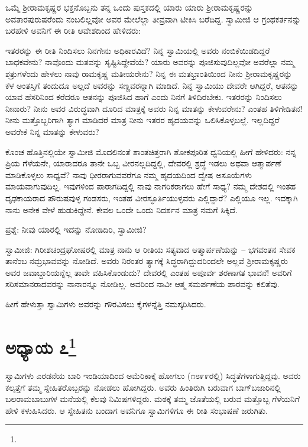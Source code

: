 ಒಮ್ಮೆ ಶ‍್ರೀರಾಮಕೃಷ್ಣರ ಭಕ್ತನೊಬ್ಬನು ತನ್ನ ಒಂದು ಪುಸ್ತಕದಲ್ಲಿ ಯಾರು ಯಾರು ಶ‍್ರೀರಾಮಕೃಷ್ಣರನ್ನು ಅವತಾರಪುರುಷರೆಂದು ನಂಬಲಿಲ್ಲವೋ ಅವರ ಮೇಲೆಲ್ಲಾ ತೀವ್ರವಾಗಿ ಟೀಕಿಸಿ ಬರೆದಿದ್ದ. ಸ್ವಾಮೀಜಿ ಆ ಗ್ರಂಥಕರ್ತನನ್ನು ಬರಹೇಳಿ ಅವನಿಗೆ ಈ ರೀತಿ ಆವೇಶದಿಂದ ಹೇಳಿದರು:

ಇತರರನ್ನು ಈ ರೀತಿ ನಿಂದಿಸಲು ನಿನಗೇನು ಅಧಿಕಾರವಿದೆ? ನಿನ್ನ ಸ್ವಾಮಿಯಲ್ಲಿ ಅವರು ನಂಬಿಕೆಯಿಡದಿದ್ದರೆ ಬಾಧಕವೇನು? ನಾವೊಂದು ಮತವನ್ನು ಸೃಷ್ಟಿಸಿದ್ದೇವೆಯೆ? ಯಾರು ಅವರನ್ನು ಪೂಜಿಸುವುದಿಲ್ಲವೋ ಅವರೆಲ್ಲಾ ನಮ್ಮ ಶತ್ರುಗಳೆಂದು ಹೇಳಲು ನಾವು ರಾಮಕೃಷ್ಣ ಮತೀಯರೇನು? ನಿನ್ನ ಈ ಮತಭ್ರಾಂತಿಯಿಂದ ನೀನು ಶ‍್ರೀರಾಮಕೃಷ್ಣರನ್ನು ಕೆಳ ಅಂತಸ್ತಿಗೆ ತಂದುದೂ ಅಲ್ಲದೆ ಅವರನ್ನು ಸಣ್ಣವರನ್ನಾಗಿ ಮಾಡಿದೆ. ನಿನ್ನ ಸ್ವಾಮಿಯು ದೇವರೇ ಆಗಿದ್ದರೆ, ಆತನನ್ನು ಯಾವ ಹೆಸರಿನಿಂದ ಕರೆದರೂ ಆತನನ್ನು ಪೂಜಿಸಿದ ಹಾಗೆ ಎಂದು ನಿನಗೆ ತಿಳಿದಿರಬೇಕು. ಇತರರನ್ನು ನಿಂದಿಸಲು ನೀನಾರು? ನೀನು ಅವರ ವಿರುದ್ಧವಾಗಿ ದೂರಿದ ಮಾತ್ರಕ್ಕೆ ಅವರು ನಿನ್ನ ಮಾತನ್ನು ಕೇಳುವರೇನು? ಎಂತಹ ತಿಳಿಗೇಡಿತನ! ನೀನು ಮತ್ತೊಬ್ಬರಿಗಾಗಿ ತ್ಯಾಗ ಮಾಡಿದರೆ ಮಾತ್ರ ನೀನು ಇತರರ ಹೃದಯವನ್ನು ಒಲಿಸಿಕೊಳ್ಳಬಲ್ಲೆ. ಇಲ್ಲದಿದ್ದರೆ ಅವರೇಕೆ ನಿನ್ನ ಮಾತನ್ನು ಕೇಳುವರು?

ಕೊಂಚ ಹೊತ್ತಿನಲ್ಲಿಯೇ ಸ್ವಾಮೀಜಿ ಮೊದಲಿನಂತೆ ಶಾಂತಚಿತ್ತರಾಗಿ ಶೋಕಪೂರಿತ ಧ್ವನಿಯಲ್ಲಿ ಹೀಗೆ ಹೇಳಿದರು: ನನ್ನ ಪ್ರಿಯ ಗೆಳೆಯನೇ, ಯಾರಾದರೂ ತಾನೇ ಒಬ್ಬ ವೀರನಲ್ಲದಿದ್ದಲ್ಲಿ, ದೇವರಲ್ಲಿ ಶ್ರದ್ಧೆ ಇಡಲು ಅಥವಾ ಆತ್ಮಾರ್ಪಣೆ ಮಾಡಿಕೊಳ್ಳಲು ಸಾಧ್ಯವೆ? ನಾವು ಧೀರರಾಗುವವರೆಗೂ ನಮ್ಮ ಹೃದಯದಿಂದ ದ್ವೇಷ ಅಸೂಯೆಗಳು ಮಾಯವಾಗುವುದಿಲ್ಲ. ಇವುಗಳಿಂದ ಪಾರಾಗದಿದ್ದಲ್ಲಿ ನಾವು ನಾಗರಿಕರಾಗಲು ಹೇಗೆ ಸಾಧ್ಯ? ನಮ್ಮ ದೇಶದಲ್ಲಿ ಇಂತಹ ದೃಢಕಾಯರಾದ ಪೌರುಷವುಳ್ಳ ಗಂಡಸರು, ಇಂತಹ ವೀರಸ್ಫೂರ್ತಿಯುಳ್ಳವರು ಎಲ್ಲಿದ್ದಾರೆ? ಎಲ್ಲಿಯೂ ಇಲ್ಲ. ಇದಕ್ಕಾಗಿ ನಾನು ಅನೇಕ ವೇಳೆ ಹುಡುಕಿದ್ದೇನೆ. ಕೇವಲ ಒಂದೇ ಒಂದು ನಿದರ್ಶನ ಮಾತ್ರ ನಮಗೆ ಸಿಕ್ಕಿದೆ.

ಪ್ರಶ್ನೆ: ನೀವು ಯಾರಲ್ಲಿ ಇದನ್ನು ನೋಡಿದಿರಿ, ಸ್ವಾಮೀಜಿ?

ಸ್ವಾಮೀಜಿ: ಗಿರೀಶಚಂದ್ರಘೋಷರಲ್ಲಿ ಮಾತ್ರ ನಾನು ಆ ರೀತಿಯ ಸತ್ಯವಾದ ಆತ್ಮಾರ್ಪಣೆಯನ್ನು – ಭಗವಂತನ ಸೇವಕ ತಾನೆಂಬ ನಮ್ರಭಾವವನ್ನು ನೋಡಿದೆ. ಅವರು ನಿರಂತರ ತ್ಯಾಗಕ್ಕೆ ಸಿದ್ಧರಾಗಿದ್ದುದರಿಂದಲೇ ಅಲ್ಲವೆ ಶ‍್ರೀರಾಮಕೃಷ್ಣರು ಅವರ ಜವಾಬ್ದಾರಿಯನ್ನೆಲ್ಲ ತಾವೇ ವಹಿಸಿಕೊಂಡುದು? ದೇವರಲ್ಲಿ ಎಂತಹ ಅಪೂರ್ವ ಶರಣಾಗತ ಭಾವನೆ! ಅವರಿಗೆ ಸರಿಸಮಾನರಾದವರನ್ನು ನಾನಾರನ್ನೂ ನೋಡಿಲ್ಲ. ಅವರಿಂದ ನಾವೀ ಆತ್ಮ ಸಮರ್ಪಣೆಯ ಪಾಠವನ್ನು ಕಲಿತೆವು.

ಹೀಗೆ ಹೇಳುತ್ತಾ ಸ್ವಾಮಿಗಳು ಅವರನ್ನು ಗೌರವಿಸಲು ಕೈಗಳನ್ನೆತ್ತಿ ನಮಸ್ಕರಿಸಿದರು.

\newpage

\chapter[ಅಧ್ಯಾಯ ೭]{ಅಧ್ಯಾಯ ೭\protect\footnote{}}

ಸ್ವಾಮಿಗಳು ಎರಡನೆಯ ಬಾರಿ ಇಂಡಿಯಾದಿಂದ ಅಮೆರಿಕಾಕ್ಕೆ ಹೋಗಲು (೧೮೯೯ರಲ್ಲಿ) ಸಿದ್ಧತೆಗಳಾಗುತ್ತಿದ್ದವು. ಅವರು ಕಲ್ಕತ್ತೆಗೆ ತಮ್ಮ ಸ್ನೇಹಿತರೊಬ್ಬರನ್ನು ನೋಡಲು ಹೋಗಿದ್ದರು. ಅವರು ಹಿಂತಿರುಗಿ ಬರುವಾಗ ಬಾಗ್‌ಬಜಾರಿನಲ್ಲಿ ಬಲರಾಮಬಾಬುಗಳ ಮನೆಯಲ್ಲಿ ಕೆಲವು ನಿಮಿಷಗಳಿದ್ದರು. ಮಠಕ್ಕೆ ತಮ್ಮ ಜೊತೆಯಲ್ಲಿ ಬರುವ ಮತ್ತೊಬ್ಬ ಗೆಳೆಯನಿಗೆ ಹೇಳಿ ಕಳುಹಿಸಿದರು. ಆ ಸ್ನೇಹಿತನು ಬಂದಾಗ ಅವನಿಗೂ ಸ್ವಾಮಿಗಳಿಗೂ ಈ ರೀತಿ ಸಂಭಾಷಣೆ ಜರುಗಿತು.


